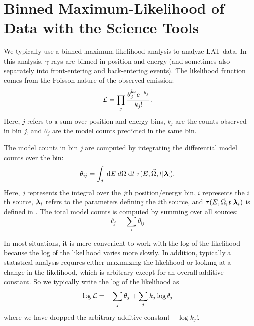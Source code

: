 \section{Binned Maximum-Likelihood of  Data with the Science Tools}

We typically use a binned maximum-likelihood analysis to analyze \ac{LAT}
data.  In this analysis, $\gamma$-rays are binned in position and energy (and
sometimes also separately into front-entering and back-entering events).
The likelihood function comes from the Poisson nature of the observed
emission:
\begin{equation}\eqnlabel{poisson_likelihood_counts_model}
  \likelihood=\prod_j \frac{\theta_j^{k_j} e^{-\theta_j}}{k_j!}.
\end{equation}
Here, $j$ refers to a sum over position and energy bins, $k_j$ are the counts
observed in bin $j$, and $\theta_j$ are the model counts predicted in
the same bin.

The model counts in bin $j$ are computed by integrating the differential
model counts over the bin:
\begin{equation}
  \theta_{ij} = \int_j \; \text{d}E \; 
  d\Omega \; \text{d}t \; 
  \tau(E,\vec\Omega,t|\boldsymbol{\lambda}_i).
\end{equation}
Here, $j$ represents the integral over the $j$th position/energy
bin, $i$ represents the $i$th source, $\boldsymbol{\lambda}_i$
refers to the parameters defining the $i$th source, and
$\tau(E,\vec\Omega,t|\boldsymbol{\lambda}_i)$ is defined in
. The total model counts is computed by summing over
all sources:
\begin{equation}
  \theta_j = \sum_i \theta_{ij}
\end{equation}

In most situations, it is more convenient to work with the log of
the likelihood because the log of the likelihood varies more slowly.
In addition, typically a statistical analysis requires either maximizing the
likelihood or looking at a change in the likelihood, which is
arbitrary except for an overall additive constant. So we typically
write the log of the likelihood as
\begin{equation}\eqnlabel{log_likelihood_sum_theta}
  \log\likelihood = -\sum_j\theta_j + \sum_j k_j\log\theta_j 
\end{equation}
where we have dropped the arbitrary additive constant $-\log k_j!$.


